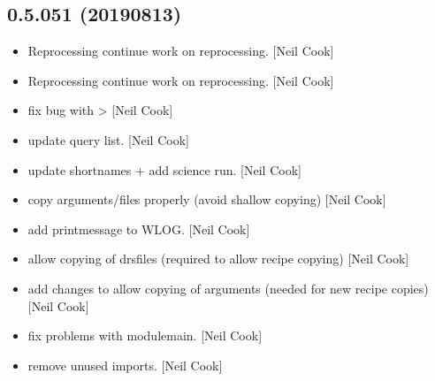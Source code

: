 \documentclass[a4paper,10pt,english]{report}
\begin{document}
\subsection{0.5.051 (2019\sphinxhyphen{}08\sphinxhyphen{}13)}
\label{\detokenize{misc/changelog:id111}}\begin{itemize}
\item {} 
Reprocessing \sphinxhyphen{} continue work on reprocessing. {[}Neil Cook{]}

\item {} 
Reprocessing \sphinxhyphen{} continue work on reprocessing. {[}Neil Cook{]}

\item {} 
 \sphinxhyphen{} fix bug with 
\textendash{}\textgreater{}  {[}Neil Cook{]}

\item {} 
 \sphinxhyphen{} update query list. {[}Neil Cook{]}

\item {} 
 \sphinxhyphen{} update shortnames +
add science run. {[}Neil Cook{]}

\item {} 
 \sphinxhyphen{} copy arguments/files properly (avoid shallow
copying) {[}Neil Cook{]}

\item {} 
 \sphinxhyphen{} add printmessage to WLOG. {[}Neil Cook{]}

\item {} 
 \sphinxhyphen{} allow copying of drsfiles (required to allow
recipe copying) {[}Neil Cook{]}

\item {} 
 \sphinxhyphen{} add changes to allow copying of arguments
(needed for new recipe copies) {[}Neil Cook{]}

\item {} 
 \sphinxhyphen{} fix problems with modulemain. {[}Neil Cook{]}

\item {} 
 \sphinxhyphen{} remove unused imports. {[}Neil Cook{]}


\end{itemize}
\end{document}
